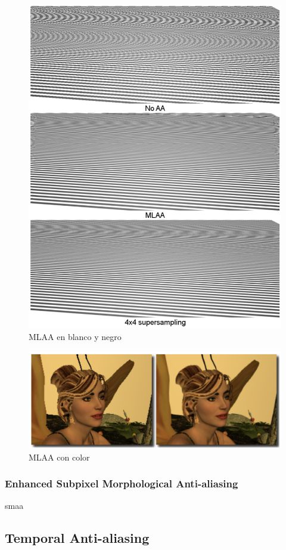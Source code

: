 \documentclass[withindex, glossary]{cam-thesis}
\begin{document}
\begin{figure}[!htbp]
    \includegraphics[width=.8\linewidth]{figures/mlaacomparison.png}
    \caption{MLAA en blanco y negro}
    \label{mlaacomparison}
\end{figure}

\begin{figure}[!htbp]
    \includegraphics[width=.8\linewidth]{figures/mlaares.png}
    \caption{MLAA con color}
    \label{mlaacomparison}
\end{figure}

\subsubsection{Enhanced Subpixel Morphological Anti-aliasing}
smaa

\subsection{Temporal Anti-aliasing}
\end{document}
